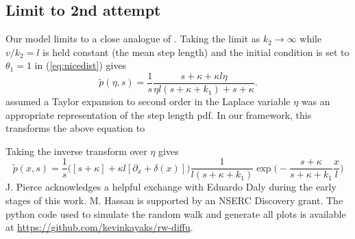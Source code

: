 \documentclass[]{agujournal2018}
\newcommand\be{\begin{equation}}
\newcommand\ee{\end{equation}}
\begin{document}
\subsection{Limit to \citet{Wu2019} 2nd attempt}
Our model limits to a close analogue of \citet{Wu2019}.
Taking the limit as $k_2 \rightarrow \infty$ while $v/k_2 = l$ is held constant (the mean step length) and the initial condition is set to $\theta_1=1$ in (\ref{eq:nicedist}) gives
\be\tilde{p}(\eta,s) = \frac{1}{s}\frac{s+\kappa + \kappa l \eta }{\eta l (s + \kappa + k_1) + s + \kappa} .\ee
\citet{Wu2019} assumed a Taylor expansion to second order in the Laplace variable $\eta$ was an appropriate representation of the step length pdf.
In our framework, this transforms the above equation to 




Taking the inverse transform over $\eta$ gives
\be \tilde{p}(x,s) = \frac{1}{s}\Big( [s+\kappa]+\kappa l[\partial_x + \delta(x)]\Big)\frac{1}{l(s+\kappa + k_1)}\exp\Big(- \frac{s+\kappa}{s+\kappa + k_1}\frac{x}{l}\Big)\ee
\acknowledgments
J. Pierce acknowledges a helpful exchange with Eduardo Daly during the early stages of this work. M. Hassan is supported by an NSERC Discovery grant. The python code used to simulate the random walk and generate all plots is available at \sloppy
\url{https://github.com/kevinkayaks/rw-diffu}.


\end{document}
